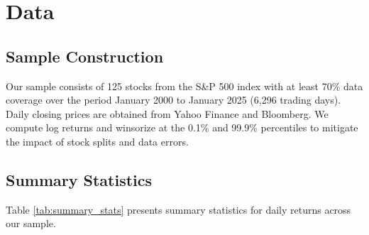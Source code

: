 \documentclass[12pt,a4paper]{article}
\begin{document}
\section{Data}
\label{sec:data}

\subsection{Sample Construction}

Our sample consists of 125 stocks from the S\&P 500 index with at least 70\% data coverage over the period January 2000 to January 2025 (6,296 trading days). Daily closing prices are obtained from Yahoo Finance and Bloomberg. We compute log returns and winsorize at the 0.1\% and 99.9\% percentiles to mitigate the impact of stock splits and data errors.

\subsection{Summary Statistics}

Table \ref{tab:summary_stats} presents summary statistics for daily returns across our sample.
\end{document}

